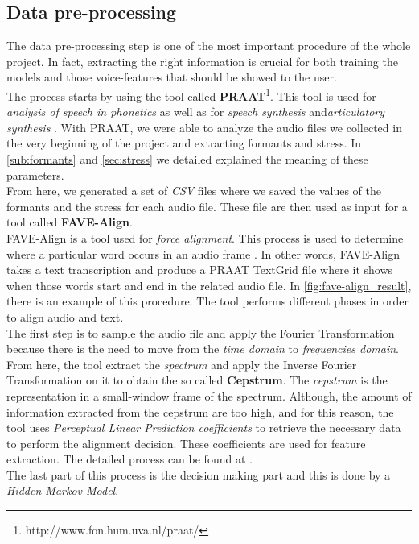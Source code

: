 \subsection{Data pre-processing}
\label{ssec:pre_processing}

The data pre-processing step is one of the most important procedure of the whole project. In fact, extracting the right information is crucial for both training the models and those voice-features that should be showed to the user. \\

\noindent The process starts by using the tool called \textbf{PRAAT}\footnote{http://www.fon.hum.uva.nl/praat/}. This tool is used for \textit{analysis of speech in phonetics} as well as for \textit{speech synthesis} and\textit{articulatory synthesis} \cite{boersma2001praat}. With PRAAT, we were able to analyze the audio files we collected in the very beginning of the project and extracting formants and stress. In \ref{sub:formants} and \ref{sec:stress} we detailed explained the meaning of these parameters. \\
From here, we generated a set of \textit{CSV} files where we saved the values of the formants and the stress for each audio file. These file are then used as input for a tool called \textbf{FAVE-Align}\cite{yuan2008speaker}. \\

\noindent FAVE-Align is a tool used for \textit{force alignment}. This process is used to determine where a particular word occurs in an audio frame \cite{forced_alignment_def}. In other words, FAVE-Align takes a text transcription and produce a PRAAT TextGrid file where it shows when those words start and end in the related audio file. In \ref{fig:fave-align_result}, there is an example of this procedure. The tool performs different phases in order to align audio and text.\\

\noindent The first step is to sample the audio file and apply the Fourier Transformation because there is the need to move from the \textit{time domain} to \textit{frequencies domain}. From here, the tool extract the \textit{spectrum} and apply the Inverse Fourier Transformation on it to obtain the so called \textbf{Cepstrum}. The \textit{cepstrum} is the representation in a small-window frame of the spectrum. Although, the amount of information extracted from the cepstrum are too high, and for this reason, the tool uses \textit{Perceptual Linear Prediction coefficients} to retrieve the necessary data to perform the alignment decision. These coefficients are used for feature extraction. The detailed process can be found at \cite{hermansky1990perceptual}. \\
The last part of this process is the decision making part and this is done by a \textit{Hidden Markov Model}. \\

